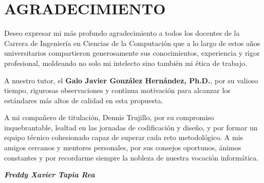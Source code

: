 
\pagestyle{empty}
\onehalfspacing
\fontsize{12}{18}\selectfont

\section*{AGRADECIMIENTO}

\vspace{1.5cm}

Deseo expresar mi más profundo agradecimiento a todos los docentes de la Carrera de Ingeniería en Ciencias de la Computación que a lo largo de estos años universitarios compartieron generosamente sus conocimientos, experiencia y rigor profesional, moldeando no solo mi intelecto sino también mi ética de trabajo.

A nuestro tutor, el \textbf{Galo Javier González Hernández, Ph.D.}, por su valioso tiempo, rigurosas observaciones y continua motivación para alcanzar los estándares más altos de calidad en esta propuesta.

A mi compañero de titulación, Dennis Trujillo, por su compromiso inquebrantable, lealtad en las jornadas de codificación y diseño, y por formar un equipo técnico cohesionado capaz de superar cada reto metodológico. A mis amigos cercanos y mentores personales, por sus consejos oportunos, ánimos constantes y por recordarme siempre la nobleza de nuestra vocación informática.

\vspace{2.5cm}

\begin{flushright}
\itshape
\textbf{Freddy Xavier Tapia Rea}
\end{flushright}

\newpage
